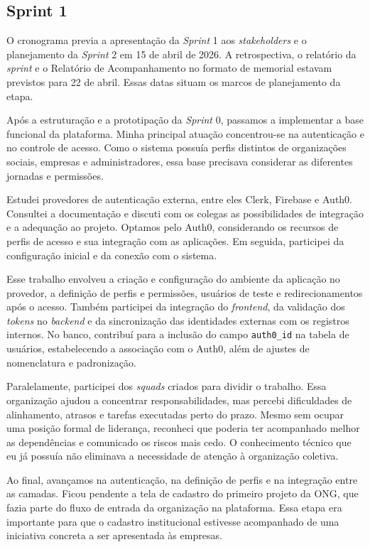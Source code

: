 \clearpage
\subsection{Sprint 1}

O cronograma previa a apresentação da \textit{Sprint} 1 aos \textit{stakeholders} e o planejamento da \textit{Sprint} 2 em 15 de abril de 2026. A retrospectiva, o relatório da \textit{sprint} e o Relatório de Acompanhamento no formato de memorial estavam previstos para 22 de abril. Essas datas situam os marcos de planejamento da etapa.

Após a estruturação e a prototipação da \textit{Sprint} 0, passamos a implementar a base funcional da plataforma. Minha principal atuação concentrou-se na autenticação e no controle de acesso. Como o sistema possuía perfis distintos de organizações sociais, empresas e administradores, essa base precisava considerar as diferentes jornadas e permissões.

Estudei provedores de autenticação externa, entre eles Clerk, Firebase e Auth0. Consultei a documentação e discuti com os colegas as possibilidades de integração e a adequação ao projeto. Optamos pelo Auth0, considerando os recursos de perfis de acesso e sua integração com as aplicações. Em seguida, participei da configuração inicial e da conexão com o sistema.

Esse trabalho envolveu a criação e configuração do ambiente da aplicação no provedor, a definição de perfis e permissões, usuários de teste e redirecionamentos após o acesso. Também participei da integração do \textit{frontend}, da validação dos \textit{tokens} no \textit{backend} e da sincronização das identidades externas com os registros internos. No banco, contribuí para a inclusão do campo \texttt{auth0\_id} na tabela de usuários, estabelecendo a associação com o Auth0, além de ajustes de nomenclatura e padronização.

Paralelamente, participei dos \textit{squads} criados para dividir o trabalho. Essa organização ajudou a concentrar responsabilidades, mas percebi dificuldades de alinhamento, atrasos e tarefas executadas perto do prazo. Mesmo sem ocupar uma posição formal de liderança, reconheci que poderia ter acompanhado melhor as dependências e comunicado os riscos mais cedo. O conhecimento técnico que eu já possuía não eliminava a necessidade de atenção à organização coletiva.

Ao final, avançamos na autenticação, na definição de perfis e na integração entre as camadas. Ficou pendente a tela de cadastro do primeiro projeto da \ac{ONG}, que fazia parte do fluxo de entrada da organização na plataforma. Essa etapa era importante para que o cadastro institucional estivesse acompanhado de uma iniciativa concreta a ser apresentada às empresas.

